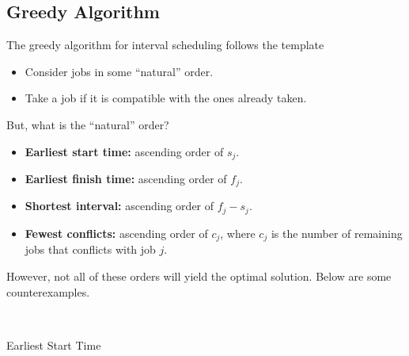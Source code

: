 \subsection{Greedy Algorithm}

The greedy algorithm for interval scheduling follows the template
\begin{itemize}
    \item Consider jobs in some ``natural'' order.
    \item Take a job if it is compatible with the ones already taken.
\end{itemize}

But, what is the ``natural'' order?
\begin{itemize}
    \item \textbf{Earliest start time:} ascending order of $s_j$.
    \item \textbf{Earliest finish time:} ascending order of $f_j$.
    \item \textbf{Shortest interval:} ascending order of $f_j - s_j$.
    \item \textbf{Fewest conflicts:} ascending order of $c_j$, where $c_j$ is the number of remaining jobs that conflicts with job $j$.
\end{itemize}

However, not all of these orders will yield the optimal solution. Below are some counterexamples.

{~~~}

\begin{minipage}[t]{0.55\linewidth}
    \begin{center}  \end{center}
\end{minipage}
\begin{minipage}[t]{0.35\linewidth}
    \begin{center}
        Earliest Start Time
    \end{center}
\end{minipage}

